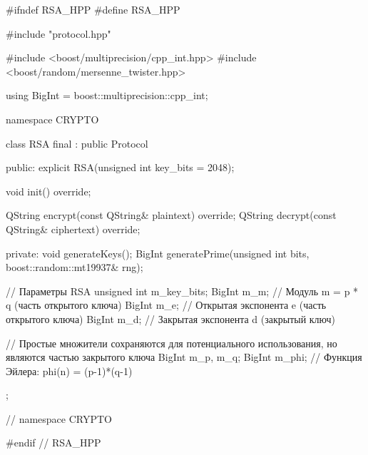 \begin{nvimstyle}
#ifndef RSA_HPP
#define RSA_HPP

#include "protocol.hpp"

#include <boost/multiprecision/cpp_int.hpp>
#include <boost/random/mersenne_twister.hpp>

using BigInt = boost::multiprecision::cpp_int;

namespace CRYPTO
{
class RSA final : public Protocol
{
public:
	explicit RSA(unsigned int key_bits = 2048);

	void init() override;

	QString encrypt(const QString& plaintext) override;
	QString decrypt(const QString& ciphertext) override;

private:
	void generateKeys();
	BigInt generatePrime(unsigned int bits, boost::random::mt19937& rng);

	// Параметры RSA
	unsigned int m_key_bits;
	BigInt		 m_m; // Модуль m = p * q (часть открытого ключа)
	BigInt		 m_e; // Открытая экспонента e (часть открытого ключа)
	BigInt		 m_d; // Закрытая экспонента d (закрытый ключ)

	// Простые множители сохраняются для потенциального использования, но являются частью закрытого ключа
	BigInt m_p, m_q;
	BigInt m_phi; // Функция Эйлера: phi(n) = (p-1)*(q-1)
};
} // namespace CRYPTO

#endif // RSA_HPP

\end{nvimstyle}